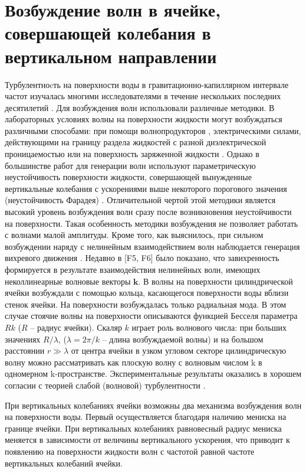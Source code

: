 \section{Возбуждение волн в ячейке, совершающей колебания в вертикальном направлении} \label{subsect_boundary}
Турбулентноcть на поверхности воды в гравитационно-капиллярном интервале частот изучалась многими исследователями в течение нескольких последних десятилетий \cite{Falcon2007, Henry2000, Shats2010, Denissenko2007}. Для возбуждения волн использовали различные методики. В лабораторных условиях волны на поверхности жидкости могут возбуждаться различными способами: при помощи волнопродукторов \cite{Havelock1929, Falcon2007}, электрическими силами, действующими на границу раздела жидкостей с разной диэлектрической проницаемостью \cite{Kalinichenko1982} или на поверхность заряженной жидкости \cite{Brazhnikov2002}. Однако в большинстве работ для генерации волн используют параметрическую неустойчивость поверхности жидкости, совершающей вынужденные вертикальные колебания с ускорениями выше некоторого порогового значения (неустойчивость Фарадея) \cite{Henry2000, Shats2010, Denissenko2007}. Отличительной чертой этой методики является высокий уровень возбуждения волн сразу после возникновения неустойчивости на поверхности. Такая особенность методики возбуждения не позволяет работать с волнами малой амплитуды. Кроме того, как выяснилось, при сильном возбуждении наряду с нелинейным взаимодействием волн наблюдается генерация вихревого движения \cite{VonKameke2011, Francois2013}. Недавно в [F5, F6] было показано, что завихренность формируется в результате взаимодействия нелинейных волн, имеющих неколлинеарные волновые векторы $\mathbf{k}$. В \cite{Brazhnikov_EPL} волны на поверхности цилиндрической ячейки возбуждали с помощью кольца, касающегося поверхности воды вблизи стенок ячейки. На поверхности возбуждалась только радиальная мода. В этом случае стоячие волны на поверхности описываются функцией Бесселя параметра $Rk$ ($R$ – радиус ячейки). Скаляр $k$ играет роль волнового числа: при больших значениях $R/\lambda$, ($\lambda = 2\pi/k$ – длина возбуждаемой волны) и на большом расстоянии $r \gg \lambda$ от центра ячейки в узком угловом секторе цилиндрическую волну можно рассматривать как плоскую волну с волновым числом k в одномерном k-пространстве. Экспериментальные результаты \cite{Brazhnikov_EPL} оказались в хорошем согласии с теорией слабой (волновой) турбулентности \cite{Zakharov}.


При вертикальных колебаниях ячейки возможны два механизма возбуждения волн на поверхности воды. Первый осуществляется благодаря наличию мениска на границе ячейки. При вертикальных колебаниях равновесный радиус мениска меняется в зависимости от величины вертикального ускорения, что приводит к появлению на поверхности жидкости волн с частотой равной частоте вертикальных колебаний ячейки. 

